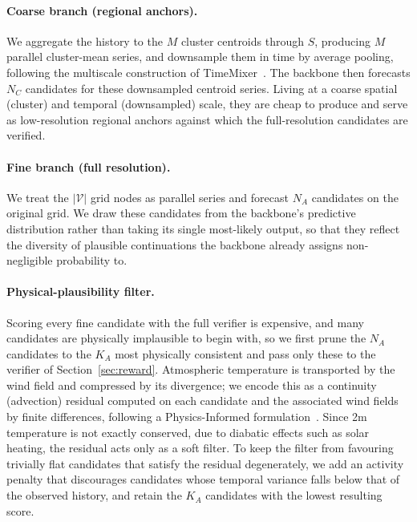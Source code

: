 \documentclass[preprint,12pt]{elsarticle}
\begin{document}
\paragraph{Coarse branch (regional anchors).} We aggregate the history to the $M$ cluster centroids through $S$, producing $M$ parallel cluster-mean series, and downsample them in time by average pooling, following the multiscale construction of TimeMixer~\citep{wang2024timemixer}. The backbone then forecasts $N_C$ candidates for these downsampled centroid series. Living at a coarse spatial (cluster) and temporal (downsampled) scale, they are cheap to produce and serve as low-resolution regional anchors against which the full-resolution candidates are verified.

\paragraph{Fine branch (full resolution).} We treat the $|\mathcal{V}|$ grid nodes as parallel series and forecast $N_A$ candidates on the original grid. We draw these candidates from the backbone's predictive distribution rather than taking its single most-likely output, so that they reflect the diversity of plausible continuations the backbone already assigns non-negligible probability to.

\paragraph{Physical-plausibility filter.} Scoring every fine candidate with the full verifier is expensive, and many candidates are physically implausible to begin with, so we first prune the $N_A$ candidates to the $K_A$ most physically consistent and pass only these to the verifier of Section~\ref{sec:reward}. Atmospheric temperature is transported by the wind field and compressed by its divergence; we encode this as a continuity (advection) residual computed on each candidate and the associated wind fields by finite differences, following a Physics-Informed formulation~\citep{verma2024climode, park2025pint, cao2026pinfdit}. Since 2m temperature is not exactly conserved, due to diabatic effects such as solar heating, the residual acts only as a soft filter. To keep the filter from favouring trivially flat candidates that satisfy the residual degenerately, we add an activity penalty that discourages candidates whose temporal variance falls below that of the observed history, and retain the $K_A$ candidates with the lowest resulting score.
\end{document}
